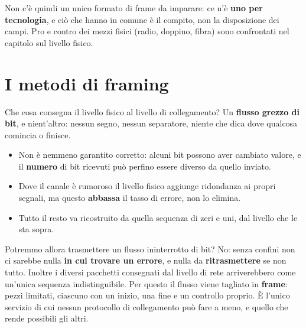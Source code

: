 Non c'è quindi un unico formato di frame da imparare: ce n'è \textbf{uno per tecnologia}, e ciò che hanno in comune è il compito,
non la disposizione dei campi. Pro e contro dei mezzi fisici (radio, doppino, fibra) sono confrontati nel capitolo sul livello
fisico.

\section{I metodi di framing}

Che cosa consegna il livello fisico al livello di collegamento? Un \textbf{flusso grezzo di bit}, e nient'altro: nessun segno,
nessun separatore, niente che dica dove qualcosa comincia o finisce.

\begin{itemize}
    \item Non è nemmeno garantito corretto: alcuni bit possono aver cambiato valore, e il \textbf{numero} di bit ricevuti può perfino
          essere diverso da quello inviato.
    \item Dove il canale è rumoroso il livello fisico aggiunge ridondanza ai propri segnali, ma questo \textbf{abbassa} il tasso di
          errore, non lo elimina.
    \item Tutto il resto va ricostruito da quella sequenza di zeri e uni, dal livello che le sta sopra.
\end{itemize}

Potremmo allora trasmettere un flusso ininterrotto di bit? No: senza confini non ci sarebbe nulla \textbf{in cui trovare un errore},
e nulla da \textbf{ritrasmettere} se non tutto. Inoltre i diversi pacchetti consegnati dal livello di rete arriverebbero come un'unica
sequenza indistinguibile. Per questo il flusso viene tagliato in \textbf{frame}: pezzi limitati, ciascuno con un inizio, una fine e
un controllo proprio. È l'unico servizio di cui nessun protocollo di collegamento può fare a meno, e quello che rende possibili gli
altri.


